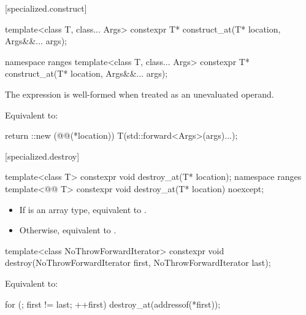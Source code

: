 [specialized.construct]{}

\begin{itemdecl}
template<class T, class... Args>
  constexpr T* construct_at(T* location, Args&&... args);

namespace ranges {
  template<class T, class... Args>
    constexpr T* construct_at(T* location, Args&&... args);
}
\end{itemdecl}

\begin{itemdescr}
\pnum
\constraints
The expression 
is well-formed when treated as an unevaluated operand.

\pnum
\effects
Equivalent to:
\begin{codeblock}
return ::new (@@(*location)) T(std::forward<Args>(args)...);
\end{codeblock}
\end{itemdescr}

[specialized.destroy]{}

%
\begin{itemdecl}
template<class T>
  constexpr void destroy_at(T* location);
namespace ranges {
  template<@@ T>
    constexpr void destroy_at(T* location) noexcept;
}
\end{itemdecl}

\begin{itemdescr}
\pnum
\effects
\begin{itemize}
\item If  is an array type, equivalent to
  .
\item Otherwise, equivalent to
  .
\end{itemize}
\end{itemdescr}

%
\begin{itemdecl}
template<class NoThrowForwardIterator>
  constexpr void destroy(NoThrowForwardIterator first, NoThrowForwardIterator last);
\end{itemdecl}

\begin{itemdescr}
\pnum
\effects
Equivalent to:
\begin{codeblock}
for (; first != last; ++first)
  destroy_at(addressof(*first));
\end{codeblock}
\end{itemdescr}

